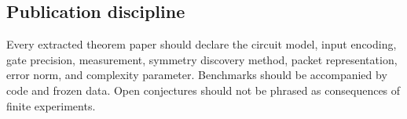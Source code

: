 \subsection{Publication discipline}
Every extracted theorem paper should declare the circuit model, input encoding, gate precision, measurement, symmetry discovery method, packet representation, error norm, and complexity parameter. Benchmarks should be accompanied by code and frozen data. Open conjectures should not be phrased as consequences of finite experiments.


